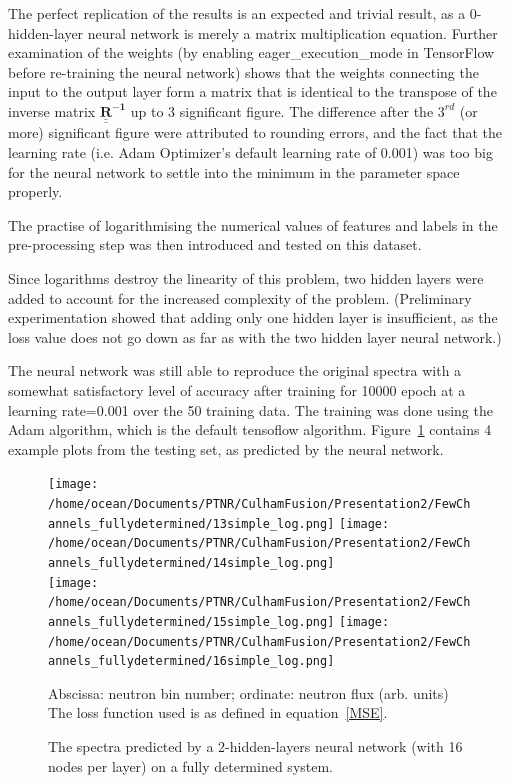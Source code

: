 \documentclass[a4paper, 12pt]{article}
\begin{document}
    The perfect replication of the results is an expected and trivial result, as a 0-hidden-layer neural network is merely a matrix multiplication equation. Further examination of the weights (by enabling eager\_execution\_mode in TensorFlow before re-training the neural network) shows that the weights connecting the input to the output layer form a matrix that is identical to the transpose of the inverse matrix $\mathbf{\underline{\underline{R}}^{-1}}$ up to 3 significant figure. The difference after the $3^{rd}$ (or more) significant figure were attributed to rounding errors, and the fact that the learning rate (i.e. Adam Optimizer's default learning rate of 0.001) was too big for the neural network to settle into the minimum in the parameter space properly.

    The practise of logarithmising the numerical values of features and labels in the pre-processing step was then introduced and tested on this dataset.

    Since logarithms destroy the linearity of this problem, two hidden layers were added to account for the increased complexity of the problem. (Preliminary experimentation showed that adding only one hidden layer is insufficient, as the loss value does not go down as far as with the two hidden layer neural network.)

    The neural network was still able to reproduce the original spectra with a somewhat satisfactory level of accuracy after training for 10000 epoch at a learning rate=0.001 over the 50 training data. The training was done using the Adam algorithm, which is the default tensoflow algorithm. Figure~\ref{5x5} contains 4 example plots from the testing set, as predicted by the neural network.

    \begin{figure}
    \centering
    \texttt{[image: /home/ocean/Documents/PTNR/CulhamFusion/Presentation2/FewChannels\_fullydetermined/13simple\_log.png]}
    \texttt{[image: /home/ocean/Documents/PTNR/CulhamFusion/Presentation2/FewChannels\_fullydetermined/14simple\_log.png]}\\
    \texttt{[image: /home/ocean/Documents/PTNR/CulhamFusion/Presentation2/FewChannels\_fullydetermined/15simple\_log.png]}
    \texttt{[image: /home/ocean/Documents/PTNR/CulhamFusion/Presentation2/FewChannels\_fullydetermined/16simple\_log.png]}
    \caption{The spectra predicted by a 2-hidden-layers neural network (with 16 nodes per layer) on a fully determined system.} \label{5x5}
    Abscissa: neutron bin number; ordinate: neutron flux (arb. units)\\
    The loss function used is as defined in equation~\ref{MSE}.
    \end{figure}
\end{document}
